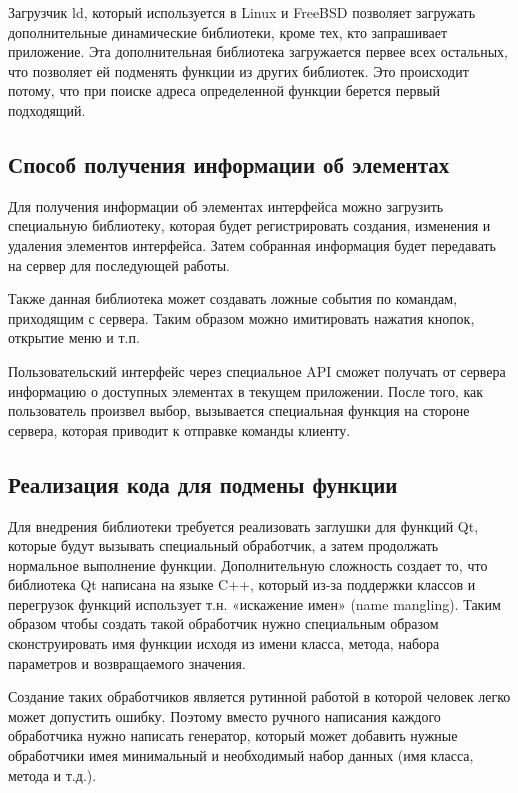 Загрузчик ld, который используется в Linux и FreeBSD позволяет загружать
дополнительные динамические библиотеки, кроме тех, кто запрашивает приложение.
Эта дополнительная библиотека загружается первее всех остальных, что позволяет
ей подменять функции из других библиотек. Это происходит потому, что при поиске
адреса определенной функции берется первый подходящий.

\subsection{Способ получения информации об элементах}

Для получения информации об элементах интерфейса можно загрузить специальную
библиотеку, которая будет регистрировать создания, изменения и удаления
элементов интерфейса. Затем собранная информация будет передавать на сервер для
последующей работы.

Также данная библиотека может создавать ложные события по командам, приходящим с
сервера. Таким образом можно имитировать нажатия кнопок, открытие меню и т.п.

Пользовательский интерфейс через специальное API сможет получать от сервера
информацию о доступных элементах в текущем приложении. После того, как
пользователь произвел выбор, вызывается специальная функция на стороне сервера,
которая приводит к отправке команды клиенту.

\subsection{Реализация кода для подмены функции}

Для внедрения библиотеки требуется реализовать заглушки для функций Qt, которые
будут вызывать специальный обработчик, а затем продолжать нормальное выполнение
функции. Дополнительную сложность создает то, что библиотека Qt написана на
языке C++, который из-за поддержки классов и перегрузок функций использует т.н.
«искажение имен» (name mangling). Таким образом чтобы создать такой обработчик
нужно специальным образом сконструировать имя функции исходя из имени класса,
метода, набора параметров и возвращаемого значения.

Создание таких обработчиков является рутинной работой в которой человек легко
может допустить ошибку. Поэтому вместо ручного написания каждого обработчика
нужно написать генератор, который может добавить нужные обработчики имея
минимальный и необходимый набор данных (имя класса, метода и т.д.).

